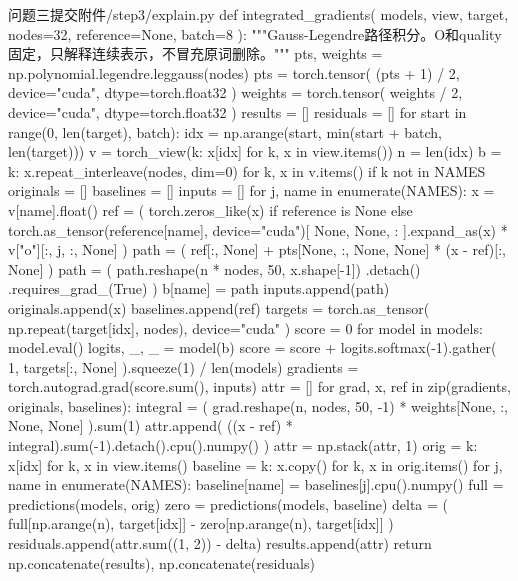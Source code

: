 \begin{appendices}
\begin{Python}{问题三提交附件/step3/explain.py}
def integrated_gradients(
    models, view, target, nodes=32, reference=None, batch=8
):
    """Gauss-Legendre路径积分。O和quality固定，只解释连续表示，不冒充原词删除。"""
    pts, weights = np.polynomial.legendre.leggauss(nodes)
    pts = torch.tensor(
        (pts + 1) / 2, device="cuda", dtype=torch.float32
    )
    weights = torch.tensor(
        weights / 2, device="cuda", dtype=torch.float32
    )
    results = []
    residuals = []
    for start in range(0, len(target), batch):
        idx = np.arange(start, min(start + batch, len(target)))
        v = torch_view({k: x[idx] for k, x in view.items()})
        n = len(idx)
        b = {
            k: x.repeat_interleave(nodes, dim=0)
            for k, x in v.items()
            if k not in NAMES
        }
        originals = []
        baselines = []
        inputs = []
        for j, name in enumerate(NAMES):
            x = v[name].float()
            ref = (
                torch.zeros_like(x)
                if reference is None
                else torch.as_tensor(reference[name], device="cuda")[
                    None, None, :
                ].expand_as(x)
                * v["o"][:, j, :, None]
            )
            path = (
                ref[:, None]
                + pts[None, :, None, None] * (x - ref)[:, None]
            )
            path = (
                path.reshape(n * nodes, 50, x.shape[-1])
                .detach()
                .requires_grad_(True)
            )
            b[name] = path
            inputs.append(path)
            originals.append(x)
            baselines.append(ref)
        targets = torch.as_tensor(
            np.repeat(target[idx], nodes), device="cuda"
        )
        score = 0
        for model in models:
            model.eval()
            logits, _, _ = model(b)
            score = score + logits.softmax(-1).gather(
                1, targets[:, None]
            ).squeeze(1) / len(models)
        gradients = torch.autograd.grad(score.sum(), inputs)
        attr = []
        for grad, x, ref in zip(gradients, originals, baselines):
            integral = (
                grad.reshape(n, nodes, 50, -1)
                * weights[None, :, None, None]
            ).sum(1)
            attr.append(
                ((x - ref) * integral).sum(-1).detach().cpu().numpy()
            )
        attr = np.stack(attr, 1)
        orig = {k: x[idx] for k, x in view.items()}
        baseline = {k: x.copy() for k, x in orig.items()}
        for j, name in enumerate(NAMES):
            baseline[name] = baselines[j].cpu().numpy()
        full = predictions(models, orig)
        zero = predictions(models, baseline)
        delta = (
            full[np.arange(n), target[idx]]
            - zero[np.arange(n), target[idx]]
        )
        residuals.append(attr.sum((1, 2)) - delta)
        results.append(attr)
    return np.concatenate(results), np.concatenate(residuals)



\end{Python}
\end{appendices}
